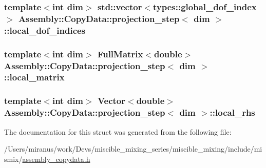 \subsubsection[{local\+\_\+dof\+\_\+indices}]{\setlength{\rightskip}{0pt plus 5cm}template$<$int dim$>$ std\+::vector$<$types\+::global\+\_\+dof\+\_\+index$>$ {\bf Assembly\+::\+Copy\+Data\+::projection\+\_\+step}$<$ dim $>$\+::local\+\_\+dof\+\_\+indices}\label{struct_assembly_1_1_copy_data_1_1projection__step_a96eade218526cf002d141d536572b75d}
\hypertarget{struct_assembly_1_1_copy_data_1_1projection__step_afd29a90013688a947f0100bd4541e1d1}{}
\subsubsection[{local\+\_\+matrix}]{\setlength{\rightskip}{0pt plus 5cm}template$<$int dim$>$ Full\+Matrix$<$double$>$ {\bf Assembly\+::\+Copy\+Data\+::projection\+\_\+step}$<$ dim $>$\+::local\+\_\+matrix}\label{struct_assembly_1_1_copy_data_1_1projection__step_afd29a90013688a947f0100bd4541e1d1}
\hypertarget{struct_assembly_1_1_copy_data_1_1projection__step_afe718ce6054f5dc781f60bdc2b1bdc82}{}
\subsubsection[{local\+\_\+rhs}]{\setlength{\rightskip}{0pt plus 5cm}template$<$int dim$>$ Vector$<$double$>$ {\bf Assembly\+::\+Copy\+Data\+::projection\+\_\+step}$<$ dim $>$\+::local\+\_\+rhs}\label{struct_assembly_1_1_copy_data_1_1projection__step_afe718ce6054f5dc781f60bdc2b1bdc82}


The documentation for this struct was generated from the following file\+:\begin{DoxyCompactItemize}
\item 
/\+Users/miranus/work/\+Devs/miscible\+\_\+mixing\+\_\+series/miscible\+\_\+mixing/include/mismix/\hyperlink{assembly__copydata_8h}{assembly\+\_\+copydata.\+h}\end{DoxyCompactItemize}
